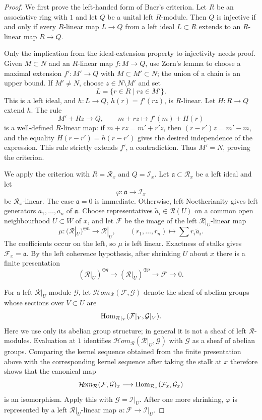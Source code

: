 \begin{proof}
We first prove the left-handed form of Baer's criterion. Let $R$ be an
associative ring with $1$ and let $Q$ be a unital left $R$-module. Then $Q$
is injective if and only if every $R$-linear map $L \to Q$ from a left ideal
$L \subset R$ extends to an $R$-linear map $R \to Q$.

Only the implication from the ideal-extension property to injectivity needs
proof. Given $M \subset N$ and an $R$-linear map $f : M \to Q$, use Zorn's
lemma to choose a maximal extension $f' : M' \to Q$ with
$M \subset M' \subset N$; the union of a chain is an upper bound. If
$M' \neq N$, choose $z \in N \setminus M'$ and set
$$
L = \{r \in R \mid rz \in M'\}.
$$
This is a left ideal, and $h : L \to Q$, $h(r) = f'(rz)$, is $R$-linear.
Let $H : R \to Q$ extend $h$. The rule
$$
M' + Rz \longrightarrow Q,
\qquad
m + rz \longmapsto f'(m) + H(r)
$$
is a well-defined $R$-linear map: if $m + rz = m' + r'z$, then
$(r-r')z = m'-m$, and the equality $H(r-r') = h(r-r')$ gives the desired
independence of the expression. This rule strictly extends $f'$, a
contradiction. Thus $M'=N$, proving the criterion.

We apply the criterion with $R = \mathcal{R}_x$ and
$Q = \mathcal{I}_x$. Let $\mathfrak a \subset \mathcal{R}_x$ be a left
ideal and let
$$
\varphi : \mathfrak a \longrightarrow \mathcal{I}_x
$$
be $\mathcal{R}_x$-linear. The case $\mathfrak a=0$ is immediate. Otherwise,
left Noetherianity gives left generators $a_1, \ldots, a_n$ of
$\mathfrak a$. Choose representatives $\widetilde a_i \in \mathcal{R}(U)$
on a common open neighbourhood $U \subset W$ of $x$, and let $\mathcal{F}$
be the image of the left $\mathcal{R}|_U$-linear map
$$
\mu : (\mathcal{R}|_U)^{\oplus n} \longrightarrow \mathcal{R}|_U,
\qquad
(r_1, \ldots, r_n) \longmapsto \sum r_i\widetilde a_i.
$$
The coefficients occur on the left, so $\mu$ is left linear. Exactness of
stalks gives $\mathcal{F}_x=\mathfrak a$. By the left coherence hypothesis,
after shrinking $U$ about $x$ there is a finite presentation
$$
(\mathcal{R}|_U)^{\oplus q} \longrightarrow
(\mathcal{R}|_U)^{\oplus p} \longrightarrow
\mathcal{F} \longrightarrow 0.
$$

For a left $\mathcal{R}|_U$-module $\mathcal{G}$, let
$\mathcal{H}\!om_{\mathcal{R}}(\mathcal{F}, \mathcal{G})$ denote the sheaf
of abelian groups whose sections over $V \subset U$ are
$$
\mathop{\rm Hom}\nolimits_{\mathcal{R}|_V}
(\mathcal{F}|_V, \mathcal{G}|_V).
$$
Here we use only its abelian group structure; in general it is not a sheaf of
left $\mathcal{R}$-modules. Evaluation at $1$ identifies
$\mathcal{H}\!om_{\mathcal{R}}(\mathcal{R}|_U, \mathcal{G})$ with
$\mathcal{G}$ as a sheaf of abelian groups. Comparing the kernel sequence
obtained from the finite presentation above with the corresponding kernel
sequence after taking the stalk at $x$ therefore shows that the canonical map
$$
\mathcal{H}\!om_{\mathcal{R}}(\mathcal{F}, \mathcal{G})_x
\longrightarrow
\mathop{\rm Hom}\nolimits_{\mathcal{R}_x}
(\mathcal{F}_x, \mathcal{G}_x)
$$
is an isomorphism. Apply this with $\mathcal{G}=\mathcal{I}|_U$. After one
more shrinking, $\varphi$ is represented by a left
$\mathcal{R}|_U$-linear map $u : \mathcal{F} \to \mathcal{I}|_U$.


\end{proof}
